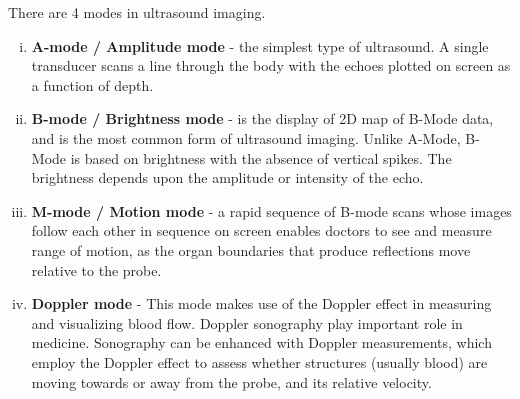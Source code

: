 \documentclass[12pt]{article}
\begin{document}
There are 4 modes in ultrasound imaging. 
\begin{enumerate}[i.]
    \item \textbf{A-mode / Amplitude mode} -  the simplest type of ultrasound. A single transducer scans a line through the body with the echoes plotted on screen as a function of depth. 
    \item \textbf{B-mode / Brightness mode} - is the display of 2D map of B-Mode data, and is the most common form of ultrasound imaging. Unlike A-Mode, B-Mode is based on brightness with the absence of vertical spikes. The brightness depends upon the amplitude or intensity of the echo.
    \item \textbf{M-mode / Motion mode} - a rapid sequence of B-mode scans whose images follow each other in sequence on screen enables doctors to see and measure range of motion, as the organ boundaries that produce reflections move relative to the probe.
    \item \textbf{Doppler mode} - This mode makes use of the Doppler effect in measuring and visualizing blood flow. Doppler sonography play important role in medicine. Sonography can be enhanced with Doppler measurements, which employ the Doppler effect to assess whether structures (usually blood) are moving towards or away from the probe, and its relative velocity. 
\end{enumerate}
\end{document}
